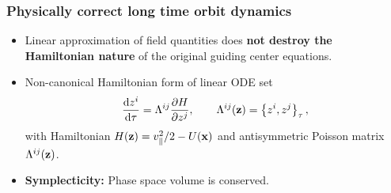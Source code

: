 \documentclass{beamer}
\newcommand{\be}[1]{\begin{equation} \label{#1}}
\newcommand{\ee}{\end{equation}}
\newcommand{\difp}[2]{\frac{\partial #1}{\partial #2}}
\newcommand{\bz}{{\bf z}}
\newcommand{\bx}{{\bf x}}
\newcommand{\rd}{{\rm d}}
\begin{document}
\begin{frame}
\frametitle{Physically correct long time orbit dynamics}
\vspace{-0.5cm}
\begin{itemize}
	\item
	Linear approximation of field quantities does \textbf{not destroy the Hamiltonian nature} of the original guiding center equations.
	\item Non-canonical Hamiltonian form of linear ODE set
	\be{hamform}
	\frac{\rd z^i}{\rd \tau}=\Lambda^{ij}\difp{H}{z^j}, \qquad \Lambda^{ij}(\bz)=\left\{z^i,z^j\right\}_\tau,
	\ee
	with Hamiltonian $H(\bz)=v_\parallel^2/2-U(\bx)$ and antisymmetric Poisson matrix  $\Lambda^{ij}(\bz)$.
	\item \textbf{Symplecticity:} Phase space volume is conserved.
\end{itemize}

\end{frame}
\end{document}
